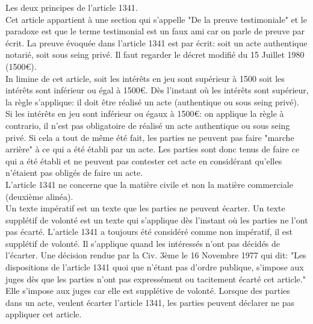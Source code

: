 Les deux principes de l'article 1341. \\
Cet article appartient à une section qui s'appelle "De la preuve testimoniale" et le paradoxe est que le terme testimonial est un faux ami car on parle de preuve par écrit. La preuve évoquée dans l'article 1341 est par écrit: soit un acte authentique notarié, soit sous seing privé. Il faut regarder le décret modifié du 15 Juillet 1980 (1500€). \\
In limine de cet article, soit les intérêts en jeu sont supérieur à 1500 soit les intérêts sont inférieur ou égal à 1500€. Dès l'instant où les intérêts sont supérieur, la règle s'applique: il doit être réalisé un acte (authentique ou sous seing privé). \\
Si les intérêts en jeu sont inférieur ou égaux à 1500€: on applique la règle à contrario, il n'est pas obligatoire de réalisé un acte authentique ou sous seing privé. Si cela a tout de même été fait, les parties ne peuvent pas faire "marche arrière" à ce qui a été établi par un acte. Les parties sont donc tenus de faire ce qui a été établi et ne peuvent pas contester cet acte en considérant qu'elles n'étaient pas obligés de faire un acte. \\
L'article 1341 ne concerne que la matière civile et non la matière commerciale (deuxième alinéa). \\
Un texte impératif est un texte que les parties ne peuvent écarter. Un texte supplétif de volonté est un texte qui s'applique dès l'instant où les parties ne l'ont pas écarté. L'article 1341 a toujours été considéré comme non impératif, il est supplétif de volonté. Il s'applique quand les intéressés n'ont pas décidés de l'écarter. Une décision rendue par la Civ. 3ème le 16 Novembre 1977 qui dit: "Les dispositions de l'article 1341 quoi que n'étant pas d'ordre publique, s'impose aux juges dès que les parties n'ont pas expressément ou tacitement écarté cet article." Elle s'impose aux juges car elle est supplétive de volonté. Lorsque des parties dans un acte, veulent écarter l'article 1341, les parties peuvent déclarer ne pas appliquer cet article.


